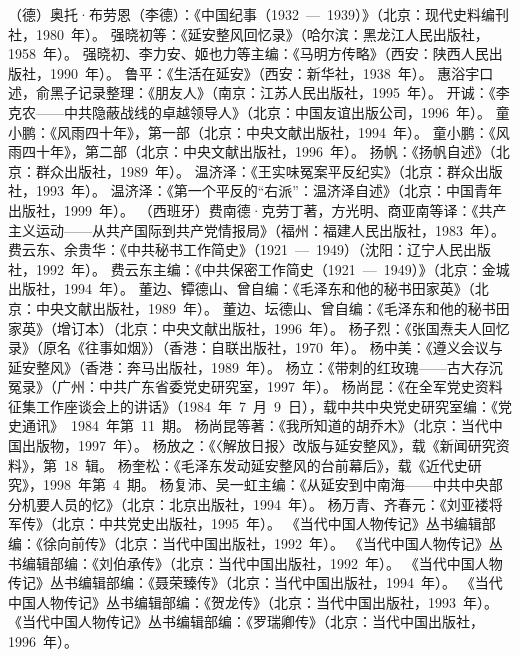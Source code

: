\begin{thebibliography}{999}
\bibitem{}（德）奥托·布劳恩（李德）：《中国纪事（1932~—~1939）》（北京：现代史料编刊社，1980~年）。
\bibitem{}强晓初等：《延安整风回忆录》（哈尔滨：黑龙江人民出版社，1958~年）。
\bibitem{}强晓初、李力安、姬也力等主编：《马明方传略》（西安：陕西人民出版社，1990~年）。
\bibitem{}鲁平：《生活在延安》（西安：新华社，1938~年）。
\bibitem{}惠浴宇口述，俞黑子记录整理：《朋友人》（南京：江苏人民出版社，1995~年）。
\bibitem{}开诚：《李克农——中共隐蔽战线的卓越领导人》（北京：中国友谊出版公司，1996~年）。
\bibitem{}童小鹏：《风雨四十年》，第一部（北京：中央文献出版社，1994~年）。
\bibitem{}童小鹏：《风雨四十年》，第二部（北京：中央文献出版社，1996~年）。
\bibitem{}扬帆：《扬帆自述》（北京：群众出版社，1989~年）。
\bibitem{}温济泽：《王实味冤案平反纪实》（北京：群众出版社，1993~年）。
\bibitem{}温济泽：《第一个平反的“右派”：温济泽自述》（北京：中国青年出版社，1999~年）。
\bibitem{}（西班牙）费南德·克劳丁著，方光明、商亚南等译：《共产主义运动——从共产国际到共产党情报局》（福州：福建人民出版社，1983~年）。
\bibitem{}费云东、余贵华：《中共秘书工作简史》（1921~—~1949）（沈阳：辽宁人民出版社，1992~年）。
\bibitem{}费云东主编：《中共保密工作简史（1921~—~1949）》（北京：金城出版社，1994~年）。
\bibitem{}董边、镡德山、曾自编：《毛泽东和他的秘书田家英》（北京：中央文献出版社，1989~年）。
\bibitem{}董边、坛德山、曾自编：《毛泽东和他的秘书田家英》（增订本）（北京：中央文献出版社，1996~年）。
\bibitem{}杨子烈：《张国焘夫人回忆录》（原名《往事如烟》）（香港：自联出版社，1970~年）。
\bibitem{}杨中美：《遵义会议与延安整风》（香港：奔马出版社，1989~年）。
\bibitem{}杨立：《带刺的红玫瑰——古大存沉冤录》（广州：中共广东省委党史研究室，1997~年）。
\bibitem{}杨尚昆：《在全军党史资料征集工作座谈会上的讲话》（1984~年~7~月~9~日），载中共中央党史研究室编：《党史通讯》~1984~年第~11~期。
\bibitem{}杨尚昆等著：《我所知道的胡乔木》（北京：当代中国出版物，1997~年）。
\bibitem{}杨放之：《〈解放日报〉改版与延安整风》，载《新闻研究资料》，第~18~辑。
\bibitem{}杨奎松：《毛泽东发动延安整风的台前幕后》，载《近代史研究》，1998~年第~4~期。
\bibitem{}杨复沛、吴一虹主编：《从延安到中南海——中共中央部分机要人员的忆》（北京：北京出版社，1994~年）。
\bibitem{}杨万青、齐春元：《刘亚褛将军传》（北京：中共党史出版社，1995~年）。
\bibitem{}《当代中国人物传记》丛书编辑部编：《徐向前传》（北京：当代中国出版社，1992~年）。
\bibitem{}《当代中国人物传记》丛书编辑部编：《刘伯承传》（北京：当代中国出版社，1992~年）。
\bibitem{}《当代中国人物传记》丛书编辑部编：《聂荣臻传》（北京：当代中国出版社，1994~年）。
\bibitem{}《当代中国人物传记》丛书编辑部编：《贺龙传》（北京：当代中国出版社，1993~年）。
\bibitem{}《当代中国人物传记》丛书编辑部编：《罗瑞卿传》（北京：当代中国出版社，1996~年）。

\end{thebibliography}
